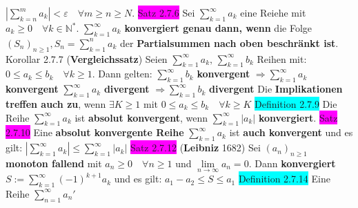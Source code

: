 \documentclass[landscape, 10pt]{article}
\newcommand{\N}{\mathbb{N}}
\begin{document}
\begin{multicols}{3}
                \textcolor{NavyBlue}{
                $|\sum_{k=n}^m a_k|<\varepsilon\quad\forall m\geqslant n\geqslant N$}. 
\colorbox{magenta}{Satz 2.7.6} Sei \textcolor{NavyBlue}{$\sum_{k=1}^\infty a_k$} 
                eine Reiehe mit \textcolor{NavyBlue}{
                $a_k\geqslant0\quad\forall k\in\N^*$. $\sum_{k=1}^\infty a_k$}
                \textbf{konvergiert genau dann, wenn} die Folge 
         \textcolor{NavyBlue}{$(S_n)_{n\geqslant1},S_n=\sum_{k=1}^n a_k$} 
                der \textbf{Partialsummen nach oben beschränkt ist}.
\colorbox{BurntOrange}{Korollar 2.7.7} (\textbf{Vergleichssatz}) Seien 
                \textcolor{NavyBlue}{$\sum_{k=1}^\infty a_k,\,\sum_{k=1}^\infty b_k$} 
                Reihen mit: 
                \textcolor{NavyBlue}{$0\leqslant a_k\leqslant b_k\quad\forall k\geqslant1$}. 
                Dann gelten: 
         \textcolor{NavyBlue}{$\sum_{k=1}^\infty b_k$} \textbf{konvergent} 
                \textcolor{NavyBlue}{$\Longrightarrow \sum_{k=1}^\infty a_k$} 
                \textbf{konvergent}
                \qquad \textcolor{NavyBlue}{$\sum_{k=1}^\infty a_k$} \textbf{divergent} 
                \textcolor{NavyBlue}{$\Longrightarrow \sum_{k=1}^\infty b_k$} 
                \textbf{divergent} 
         Die \textbf{Implikationen treffen auch zu}, wenn 
                \textcolor{NavyBlue}{$\exists K\geqslant1$} mit 
                \textcolor{NavyBlue}{$0\leqslant a_k\leqslant b_k\quad\forall k\geqslant K$}
\colorbox{cyan}{Definition 2.7.9} Die Reihe \textcolor{NavyBlue}{$\sum_{k=1}^\infty a_k$} ist 
                \textbf{absolut konvergent}, 
                wenn \textcolor{NavyBlue}{$\sum_{k=1}^\infty |a_k|$} 
                \textbf{konvergiert}.
\colorbox{magenta}{Satz 2.7.10} Eine \textbf{absolut konvergente Reihe} 
                \textcolor{NavyBlue}{$\sum_{k=1}^\infty a_k$}
                ist \textbf{auch konvergent} und es gilt:
                \textcolor{NavyBlue}{$|\sum_{k=1}^\infty a_k|\leqslant\sum_{k=1}^\infty |a_k|$}
\colorbox{magenta}{Satz 2.7.12} (\textbf{Leibniz} 1682) Sei 
                \textcolor{NavyBlue}{$(a_n)_{n\geqslant1}$}
                \textbf{monoton fallend} 
                mit \textcolor{NavyBlue}{$a_n\geqslant0\quad\forall n\geqslant1$} und 
                \textcolor{NavyBlue}{$\lim\limits_{n\to\infty}a_n=0$}. 
         Dann \textbf{konvergiert} 
                \textcolor{NavyBlue}{$S:=\sum_{k=1}^\infty (-1)^{k+1}a_k$} und es gilt: 
                \textcolor{NavyBlue}{$a_1-a_2\leqslant S\leqslant a_1$}
\colorbox{cyan}{Definition 2.7.14} Eine Reihe \textcolor{NavyBlue}{$\sum_{n=1}^\infty a_n'$} 

\end{multicols}
\end{document}
